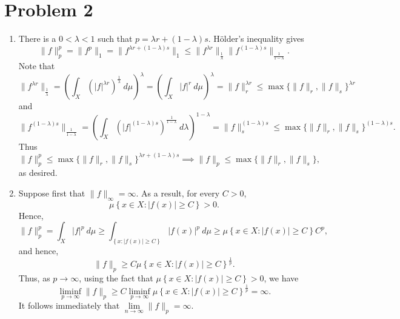 \documentclass[10pt]{amsart}
\theoremstyle{thmstyle}
\theoremstyle{defstyle}
\renewcommand{\le}{\leqslant}
\renewcommand{\ge}{\geqslant}
\begin{document}
\section{Problem 2}

\begin{enumerate}[label=(\alph*)]
\item There is a $0 < \lambda < 1$ such that $p = \lambda r + (1 - \lambda)s$. H\"older's inequality gives 
\begin{equation*}
	\|f\|_p^p = \|f^p\|_1 = \|f^{\lambda r + (1 - \lambda)s}\|_1\le \|f^{\lambda r}\|_{\frac{1}{\lambda}}\|f^{(1 - \lambda)s}\|_{\frac{1}{1 - \lambda}}.
\end{equation*}
Note that 
\begin{equation*}
	\|f^{\lambda r}\|_{\frac{1}{\lambda}} = \left(\int_{X}\left(|f|^{\lambda r}\right)^{\frac{1}{\lambda}}~d\mu\right)^{\lambda} = \left(\int_{X} |f|^r~d\mu\right)^\lambda = \|f\|_r^{\lambda r} \le\max\{\|f\|_r, \|f\|_s\}^{\lambda r}
\end{equation*}
and 
\begin{equation*}
	\|f^{(1 - \lambda)s}\|_{\frac{1}{1 - \lambda}} = \left(\int_{X}\left(|f|^{(1 - \lambda)s}\right)^{\frac{1}{1 - \lambda}}~d\lambda\right)^{1 - \lambda} = \|f\|_s^{(1 - \lambda)s}\le\max\{\|f\|_r, \|f\|_s\}^{(1 - \lambda)s}.
\end{equation*}
Thus 
\begin{equation*}
	\|f\|_p^p\le\max\{\|f\|_r, \|f\|_s\}^{\lambda r + (1 - \lambda)s}\implies\|f\|_p\le\max\{\|f\|_r, \|f\|_s\},
\end{equation*}
as desired.

\item Suppose first that $\|f\|_\infty = \infty$. As a result, for every $C > 0$, 
\begin{equation*}
	\mu\left\{x\in X\colon |f(x)|\ge C\right\} > 0.
\end{equation*}
Hence, 
\begin{equation*}
	\|f\|_p^p = \int_X |f|^p~d\mu\ge\int_{\left\{x\colon |f(x)|\ge C\right\}}|f(x)|^p~d\mu\ge \mu\left\{x\in X\colon |f(x)|\ge C\right\}C^p,
\end{equation*}
and hence, 
\begin{equation*}
	\|f\|_p\ge C\mu\left\{x\in X\colon |f(x)|\ge C\right\}^{\frac{1}{p}}.
\end{equation*}
Thus, as $p\to\infty$, using the fact that $\mu\left\{x\in X\colon |f(x)|\ge C\right\} > 0$, we have 
\begin{equation*}
	\liminf_{p\to\infty} \|f\|_p \ge C\liminf_{p\to\infty}\mu\left\{x\in X\colon |f(x)|\ge C\right\}^{\frac{1}{p}} = \infty.
\end{equation*}
It follows immediately that $\lim\limits_{n\to\infty}\|f\|_p = \infty$.


\end{enumerate}
\end{document}
